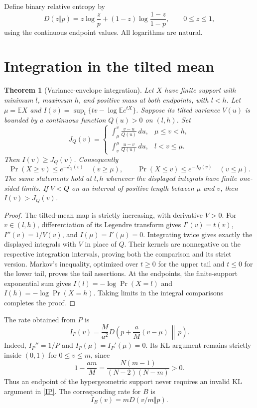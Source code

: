 \documentclass[11pt]{article}
\newtheorem{theorem}{Theorem}
\newcommand{\E}{\mathbb E}
\begin{document}
Define binary relative entropy by
\[
 D(z\Vert p)=z\log\frac zp+(1-z)\log\frac{1-z}{1-p},\qquad 0\le z\le1,
\]
using the continuous endpoint values. All logarithms are natural.

\section{Integration in the tilted mean}
\begin{theorem}[Variance-envelope integration]\label{integration}
Let $X$ have finite support with minimum $l$, maximum $h$, and positive
mass at both endpoints, with $l<h$. Let $\mu=\E X$ and
$I(v)=\sup_t\{tv-\log\E e^{tX}\}$.
Suppose its tilted variance $V(u)$ is bounded by a continuous function
$Q(u)>0$ on $(l,h)$. Set
\[
 J_Q(v)=
 \begin{cases}
 \displaystyle\int_\mu^v\frac{v-u}{Q(u)}\,du,&\mu\le v<h,\\[5pt]
 \displaystyle\int_v^\mu\frac{u-v}{Q(u)}\,du,&l<v\le\mu.
 \end{cases}
\]
Then $I(v)\ge J_Q(v)$. Consequently
\[
 \Pr(X\ge v)\le e^{-J_Q(v)}\quad(v\ge\mu),\qquad
 \Pr(X\le v)\le e^{-J_Q(v)}\quad(v\le\mu).
\]
The same statements hold at $l,h$ whenever the displayed integrals have
finite one-sided limits. If $V<Q$ on an interval of positive length between
$\mu$ and $v$, then $I(v)>J_Q(v)$.
\end{theorem}
\begin{proof}
The tilted-mean map is strictly increasing, with derivative $V>0$.
For $v\in(l,h)$, differentiation of its Legendre transform gives
$I'(v)=t(v)$, $I''(v)=1/V(v)$, and $I(\mu)=I'(\mu)=0$.
Integrating twice gives exactly the displayed integrals with $V$ in place
of $Q$. Their kernels are nonnegative on the respective integration
intervals, proving both the comparison and its strict version.
Markov's inequality, optimized over $t\ge0$ for the upper tail and
$t\le0$ for the lower tail, proves the tail assertions.
At the endpoints, the finite-support exponential sum gives
$I(l)=-\log\Pr(X=l)$ and $I(h)=-\log\Pr(X=h)$.
Taking limits in the integral comparisons completes the proof.
\end{proof}

The rate obtained from $P$ is
\begin{equation}\label{IP}
 I_P(v)=\frac M{a^2}D\left(p+\frac aM(v-\mu)\,\middle\Vert\,p\right).
\end{equation}
Indeed, $I_P''=1/P$ and $I_P(\mu)=I_P'(\mu)=0$.
Its KL argument remains strictly inside $(0,1)$ for $0\le v\le m$, since
\[
 1-\frac{am}{M}
 =\frac{N(m-1)}{(N-2)(N-m)}>0.
\]
Thus an endpoint of the hypergeometric support never requires an invalid
KL argument in \eqref{IP}. The corresponding rate for $B$ is
\begin{equation}\label{IB}
 I_B(v)=mD(v/m\Vert p).
\end{equation}
\end{document}
